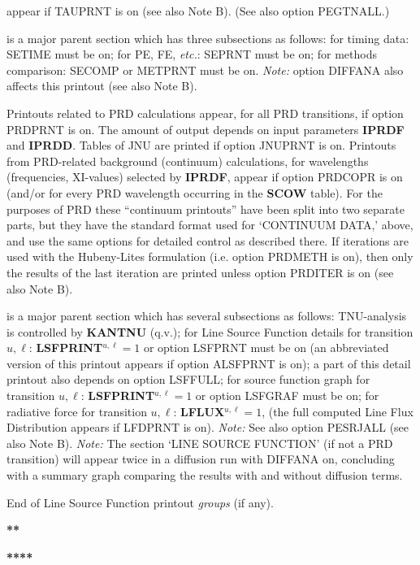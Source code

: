 appear if TAUPRNT is on (see also Note B). (See also option PEGTNALL.)
\blankline
{} \par
is a major parent section which has three subsections as follows:
\bull for timing data: SETIME must be on;
\bull for PE, FE, {\it etc.}: SEPRNT must be on;
\bull for methods comparison: SECOMP or METPRNT must be on. \np
{\it Note:} option DIFFANA also affects this printout (see also Note B).
\ej
{} \par
Printouts related to PRD calculations appear, for all
PRD transitions, if option PRDPRNT is on. The amount of output depends on
input parameters {\bf IPRDF} and {\bf IPRDD}. Tables of JNU are printed
if option JNUPRNT is on. Printouts from PRD-related background (continuum)
calculations, for wavelengths (frequencies, XI-values) selected by
{\bf IPRDF}, appear if option PRDCOPR is on (and/or for every PRD
wavelength occurring in the {\bf SCOW} table). For the purposes of PRD
these ``continuum printouts'' have been split into two separate parts,
but they have the standard format used for `CONTINUUM DATA,' above, and
use the same options for detailed control as described there.
If iterations are used with the Hubeny-Lites formulation (i.e. option
PRDMETH is on), then only the results of the last iteration are printed
unless option PRDITER is on (see also Note B).
\blankline
{} \par
is a major parent section which has several subsections as follows:
\bull TNU-analysis is controlled by {\bf KANTNU} (q.v.); \np
\bull for Line Source Function details for transition $u,\ell$:
{\bf LSFPRINT}$^{u,\ell} = 1$ or option LSFPRNT must be on
(an abbreviated version of this printout appears if option ALSFPRNT is
on); a part of this detail printout also depends on option LSFFULL; \np
\bull for source function graph for transition $u,\ell$: 
{\bf LSFPRINT}$^{u,\ell} = 1$ or option LSFGRAF must be on;
\bull for radiative force for transition $u,\ell$:
{\bf LFLUX}$^{u,\ell} = 1$, (the full computed Line Flux Distribution
appears if LFDPRNT is on). \np
{\it Note:} See also option PESRJALL (see also Note B). \np
{\it Note:} The section `LINE SOURCE FUNCTION' (if not a PRD transition)
will appear twice in a diffusion run with DIFFANA on, concluding with a
summary graph comparing the results with and without diffusion terms.
\blankline
\centerline{ End of Line Source Function printout {\it groups} (if any).}
\blankline
\centerline{\bf*}
\centerline{\bf***}
\centerline{\bf*****}
\ej
{} \par
